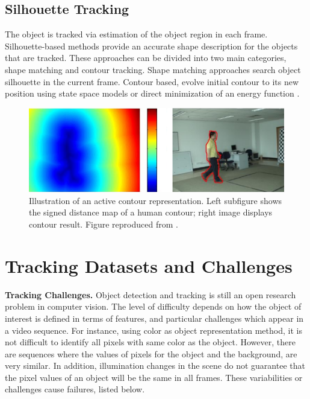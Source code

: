 \subsection{Silhouette Tracking}

The object is tracked via estimation of the object region in each frame.
Silhouette-based methods provide an accurate shape description for the
objects that are tracked. These approaches can be divided into two main
categories, shape matching and contour tracking. Shape matching \cite{Li2001}
approaches search object silhouette in the current frame. Contour based, evolve
initial contour to its new position using state space models or direct
minimization of an energy function \cite{Cremers2003,Davila2014,Niebles2010}.

\begin{figure}[h!]
	\centering
		\includegraphics[width=0.9\linewidth]{Figures/contour.png}
	\caption[Illustration of an active contour representation]
			{Illustration of an active contour representation. Left subfigure
			shows the signed distance map of a human contour; right
			image displays contour result. Figure reproduced from \cite{Yilmaz2006}.}
	\label{fig::contour}
\end{figure}	
\section{Tracking Datasets and Challenges}
\label{sec::datasets}

\textbf{Tracking Challenges. }Object detection and tracking is still an open
research problem in computer
vision. The level of difficulty depends on how the object of interest is
defined in terms of features, and particular challenges which appear in a video 
sequence.
For instance, using color as object representation
method, it is not difficult to identify all pixels with same color as the
object. However, there are sequences where the values of pixels for the object
and the background, are very similar. In addition, illumination
changes in the scene do not guarantee that the pixel values of an object
will be the same in all frames. These variabilities or challenges cause failures,
listed below.

